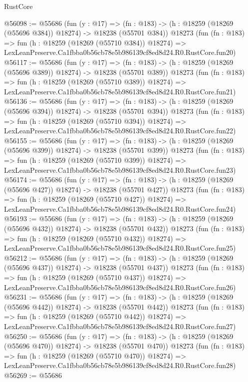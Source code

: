 \begin{lexlean}{RustCore}
\begin{coremodule}
@56098 := @55686
    (fun (y : @17) =>
    (fn : @183) -> (h : @18259 (@18269 (@55696 @384)) @18274) -> @18238 (@55701 @384))
    @18273
    (fun (fn : @183) =>
    fun (h : @18259 (@18269 (@55710 @384)) @18274) =>
    LexLeanPreserve.Ca1fbba0b56cb78e5b986139cf8ed8d24.R0.RustCore.fun20)
@56117 := @55686
    (fun (y : @17) =>
    (fn : @183) -> (h : @18259 (@18269 (@55696 @389)) @18274) -> @18238 (@55701 @389))
    @18273
    (fun (fn : @183) =>
    fun (h : @18259 (@18269 (@55710 @389)) @18274) =>
    LexLeanPreserve.Ca1fbba0b56cb78e5b986139cf8ed8d24.R0.RustCore.fun21)
@56136 := @55686
    (fun (y : @17) =>
    (fn : @183) -> (h : @18259 (@18269 (@55696 @394)) @18274) -> @18238 (@55701 @394))
    @18273
    (fun (fn : @183) =>
    fun (h : @18259 (@18269 (@55710 @394)) @18274) =>
    LexLeanPreserve.Ca1fbba0b56cb78e5b986139cf8ed8d24.R0.RustCore.fun22)
@56155 := @55686
    (fun (y : @17) =>
    (fn : @183) -> (h : @18259 (@18269 (@55696 @399)) @18274) -> @18238 (@55701 @399))
    @18273
    (fun (fn : @183) =>
    fun (h : @18259 (@18269 (@55710 @399)) @18274) =>
    LexLeanPreserve.Ca1fbba0b56cb78e5b986139cf8ed8d24.R0.RustCore.fun23)
@56174 := @55686
    (fun (y : @17) =>
    (fn : @183) -> (h : @18259 (@18269 (@55696 @427)) @18274) -> @18238 (@55701 @427))
    @18273
    (fun (fn : @183) =>
    fun (h : @18259 (@18269 (@55710 @427)) @18274) =>
    LexLeanPreserve.Ca1fbba0b56cb78e5b986139cf8ed8d24.R0.RustCore.fun24)
@56193 := @55686
    (fun (y : @17) =>
    (fn : @183) -> (h : @18259 (@18269 (@55696 @432)) @18274) -> @18238 (@55701 @432))
    @18273
    (fun (fn : @183) =>
    fun (h : @18259 (@18269 (@55710 @432)) @18274) =>
    LexLeanPreserve.Ca1fbba0b56cb78e5b986139cf8ed8d24.R0.RustCore.fun25)
@56212 := @55686
    (fun (y : @17) =>
    (fn : @183) -> (h : @18259 (@18269 (@55696 @437)) @18274) -> @18238 (@55701 @437))
    @18273
    (fun (fn : @183) =>
    fun (h : @18259 (@18269 (@55710 @437)) @18274) =>
    LexLeanPreserve.Ca1fbba0b56cb78e5b986139cf8ed8d24.R0.RustCore.fun26)
@56231 := @55686
    (fun (y : @17) =>
    (fn : @183) -> (h : @18259 (@18269 (@55696 @442)) @18274) -> @18238 (@55701 @442))
    @18273
    (fun (fn : @183) =>
    fun (h : @18259 (@18269 (@55710 @442)) @18274) =>
    LexLeanPreserve.Ca1fbba0b56cb78e5b986139cf8ed8d24.R0.RustCore.fun27)
@56250 := @55686
    (fun (y : @17) =>
    (fn : @183) -> (h : @18259 (@18269 (@55696 @470)) @18274) -> @18238 (@55701 @470))
    @18273
    (fun (fn : @183) =>
    fun (h : @18259 (@18269 (@55710 @470)) @18274) =>
    LexLeanPreserve.Ca1fbba0b56cb78e5b986139cf8ed8d24.R0.RustCore.fun28)
@56269 := @55686

\end{coremodule}
\end{lexlean}
